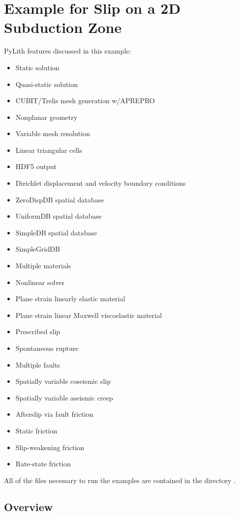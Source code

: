 \section{Example for Slip on a 2D Subduction Zone}
\label{sec:example:subduction:2d}

PyLith features discussed in this example:
\begin{itemize}
\item Static solution
\item Quasi-static solution
\item CUBIT/Trelis mesh generation w/APREPRO
\item Nonplanar geometry
\item Variable mesh resolution
\item Linear triangular cells
\item HDF5 output
\item Dirichlet displacement and velocity boundary conditions
\item ZeroDispDB spatial database
\item UniformDB spatial database
\item SimpleDB spatial database
\item SimpleGridDB
\item Multiple materials
\item Nonlinear solver
\item Plane strain linearly elastic material
\item Plane strain linear Maxwell viscoelastic material
\item Prescribed slip
\item Spontaneous rupture
\item Multiple faults
\item Spatially variable coseismic slip
\item Spatially variable aseismic creep
\item Afterslip via fault friction
\item Static friction
\item Slip-weakening friction
\item Rate-state friction
\end{itemize}
All of the files necessary to run the examples are contained in the
directory .


\subsection{Overview}

